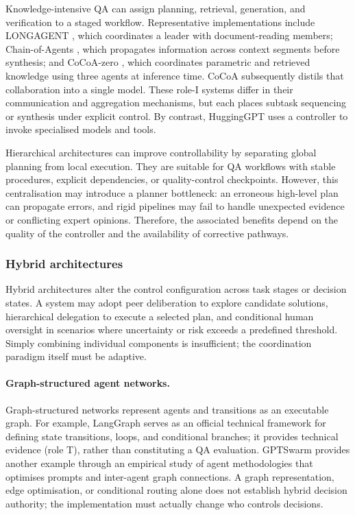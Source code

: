 \documentclass[a4paper,fleqn]{cas-dc}
\begin{document}
Knowledge-intensive QA can assign planning, retrieval, generation, and
verification to a staged workflow. Representative implementations include
LONGAGENT \citep{zhao2024longagent}, which coordinates a leader with
document-reading members; Chain-of-Agents \citep{zhang2024chain_agents},
which propagates information across context segments before synthesis; and
CoCoA-zero \citep{jiang2026cocoa}, which coordinates parametric and retrieved
knowledge using three agents at inference time. CoCoA subsequently distils
that collaboration into a single model. These role-I systems differ in their communication
and aggregation mechanisms, but each places subtask sequencing or synthesis
under explicit control. By contrast, HuggingGPT \citep{shen2024hugginggpt}
uses a controller to invoke specialised models and tools.




Hierarchical architectures can improve controllability by separating global planning from local execution. They are suitable for QA workflows with stable procedures, explicit dependencies, or quality-control checkpoints. However, this centralisation may introduce a planner bottleneck: an erroneous high-level plan can propagate errors, and rigid pipelines may fail to handle unexpected evidence or conflicting expert opinions. Therefore, the associated benefits depend on the quality of the controller and the availability of corrective pathways.

\subsubsection{Hybrid architectures}
\label{sec:hybrid}

Hybrid architectures alter the control configuration across task stages or decision states. A system may adopt peer deliberation to explore candidate solutions, hierarchical delegation to execute a selected plan, and conditional human oversight in scenarios where uncertainty or risk exceeds a predefined threshold. Simply combining individual components is insufficient; the coordination paradigm itself must be adaptive.

\paragraph{Graph-structured agent networks.}
\label{sec:graph}

Graph-structured networks represent agents and transitions as an executable graph. For example, LangGraph \citep{langgraph2024} serves as an official technical framework for defining state transitions, loops, and conditional branches; it provides technical evidence (role T), rather than constituting a QA evaluation. GPTSwarm \citep{zhuge2024gptswarm} provides another example through an empirical study of agent methodologies that optimises prompts and inter-agent graph connections. A graph representation, edge optimisation, or conditional routing alone does not establish hybrid decision authority; the implementation must actually change who controls decisions.
\end{document}
